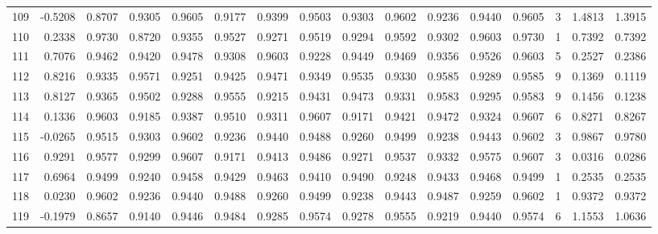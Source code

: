 \begin{tabular}{lrrrrrrrrrrrrrrr}
109 &     -0.5208 &  0.8707 &  0.9305 &  0.9605 &  0.9177 &  0.9399 &  0.9503 &  0.9303 &  0.9602 &  0.9236 &   0.9440 &     0.9605 &      3 &                    1.4813 &                     1.3915 \\
110 &      0.2338 &  0.9730 &  0.8720 &  0.9355 &  0.9527 &  0.9271 &  0.9519 &  0.9294 &  0.9592 &  0.9302 &   0.9603 &     0.9730 &      1 &                    0.7392 &                     0.7392 \\
111 &      0.7076 &  0.9462 &  0.9420 &  0.9478 &  0.9308 &  0.9603 &  0.9228 &  0.9449 &  0.9469 &  0.9356 &   0.9526 &     0.9603 &      5 &                    0.2527 &                     0.2386 \\
112 &      0.8216 &  0.9335 &  0.9571 &  0.9251 &  0.9425 &  0.9471 &  0.9349 &  0.9535 &  0.9330 &  0.9585 &   0.9289 &     0.9585 &      9 &                    0.1369 &                     0.1119 \\
113 &      0.8127 &  0.9365 &  0.9502 &  0.9288 &  0.9555 &  0.9215 &  0.9431 &  0.9473 &  0.9331 &  0.9583 &   0.9295 &     0.9583 &      9 &                    0.1456 &                     0.1238 \\
114 &      0.1336 &  0.9603 &  0.9185 &  0.9387 &  0.9510 &  0.9311 &  0.9607 &  0.9171 &  0.9421 &  0.9472 &   0.9324 &     0.9607 &      6 &                    0.8271 &                     0.8267 \\
115 &     -0.0265 &  0.9515 &  0.9303 &  0.9602 &  0.9236 &  0.9440 &  0.9488 &  0.9260 &  0.9499 &  0.9238 &   0.9443 &     0.9602 &      3 &                    0.9867 &                     0.9780 \\
116 &      0.9291 &  0.9577 &  0.9299 &  0.9607 &  0.9171 &  0.9413 &  0.9486 &  0.9271 &  0.9537 &  0.9332 &   0.9575 &     0.9607 &      3 &                    0.0316 &                     0.0286 \\
117 &      0.6964 &  0.9499 &  0.9240 &  0.9458 &  0.9429 &  0.9463 &  0.9410 &  0.9490 &  0.9248 &  0.9433 &   0.9468 &     0.9499 &      1 &                    0.2535 &                     0.2535 \\
118 &      0.0230 &  0.9602 &  0.9236 &  0.9440 &  0.9488 &  0.9260 &  0.9499 &  0.9238 &  0.9443 &  0.9487 &   0.9259 &     0.9602 &      1 &                    0.9372 &                     0.9372 \\
119 &     -0.1979 &  0.8657 &  0.9140 &  0.9446 &  0.9484 &  0.9285 &  0.9574 &  0.9278 &  0.9555 &  0.9219 &   0.9440 &     0.9574 &      6 &                    1.1553 &                     1.0636 \\

\end{tabular}
